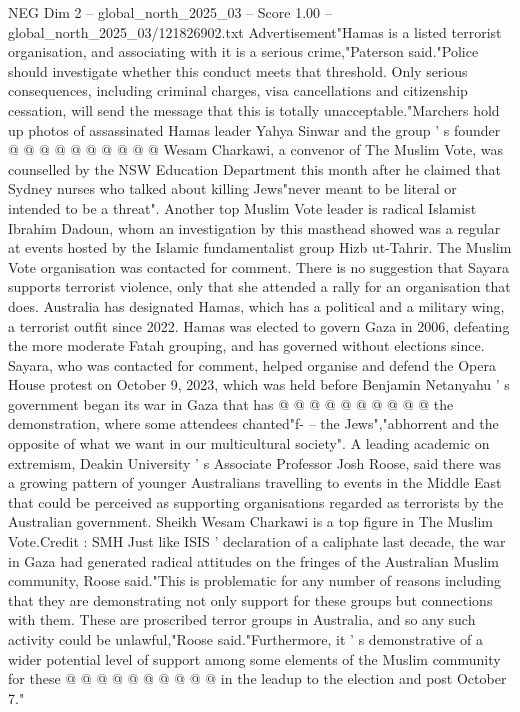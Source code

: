 \begin{textsample}{NEG Dim 2 – global\_north\_2025\_03 – Score 1.00 – global\_north\_2025\_03/121826902.txt}
Advertisement"Hamas is a listed terrorist organisation, and associating with it is a serious crime,"Paterson said."Police should investigate whether this conduct meets that threshold.
Only serious consequences, including criminal charges, visa cancellations and citizenship cessation, will send the message that this is totally unacceptable."Marchers hold up photos of assassinated Hamas leader Yahya Sinwar and the group ' s founder @ @ @ @ @ @ @ @ @ @ Wesam Charkawi, a convenor of The Muslim Vote, was counselled by the NSW Education Department this month after he claimed that Sydney nurses who talked about killing Jews"never meant to be literal or intended to be a threat".
Another top Muslim Vote leader is radical Islamist Ibrahim Dadoun, whom an investigation by this masthead showed was a regular at events hosted by the Islamic fundamentalist group Hizb ut-Tahrir.
The Muslim Vote organisation was contacted for comment.
There is no suggestion that Sayara supports terrorist violence, only that she attended a rally for an organisation that does.
Australia has designated Hamas, which has a political and a military wing, a terrorist outfit since 2022.
Hamas was elected to govern Gaza in 2006, defeating the more moderate Fatah grouping, and has governed without elections since.
Sayara, who was contacted for comment, helped organise and defend the Opera House protest on October 9, 2023, which was held before Benjamin Netanyahu ' s government began its war in Gaza that has @ @ @ @ @ @ @ @ @ @ the demonstration, where some attendees chanted"f- -- the Jews","abhorrent and the opposite of what we want in our multicultural society".
A leading academic on extremism, Deakin University ' s Associate Professor Josh Roose, said there was a growing pattern of younger Australians travelling to events in the Middle East that could be perceived as supporting organisations regarded as terrorists by the Australian government.
Sheikh Wesam Charkawi is a top figure in The Muslim Vote.Credit : SMH Just like ISIS ' declaration of a caliphate last decade, the war in Gaza had generated radical attitudes on the fringes of the Australian Muslim community, Roose said."This is problematic for any number of reasons including that they are demonstrating not only support for these groups but connections with them.
These are proscribed terror groups in Australia, and so any such activity could be unlawful,"Roose said."Furthermore, it ' s demonstrative of a wider potential level of support among some elements of the Muslim community for these @ @ @ @ @ @ @ @ @ @ in the leadup to the election and post October 7."

\end{textsample}
